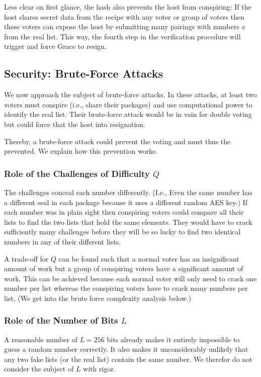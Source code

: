 \documentclass{article}
\theoremstyle{definition}
\begin{document}
	Less clear on first glance, the hash also prevents the host from conspiring: If the host shares secret data from the recipe with any voter or group of voters then these voters can expose the host by submitting many pairings with numbers $x$ from the real list. This way, the fourth step in the verification procedure will trigger and force Grace to resign.
	
	\subsection{Security: Brute-Force Attacks}
	We now approach the subject of brute-force attacks. In these attacks, at least two voters must conspire (i.e., share their packages) and use computational power to identify the real list. Their brute-force attack would be in vain for double voting but could force that the host into resignation.
	
	Thereby, a brute-force attack could prevent the voting and must thus the prevented. We explain how this prevention works.
	
	\subsubsection{Role of the Challenges of Difficulty $Q$}
	The challenges conceal each number differently. (I.e., Even the same number has a different seal in each package because it uses a different random AES key.) If each number was in plain sight then conspiring voters could compare all their lists to find the two lists that hold the same elements. They would have to crack sufficiently many challenges before they will be so lucky to find two identical numbers in any of their different lists.
	
	A trade-off for $Q$ can be found such that a normal voter has an insignificant amount of work but a group of conspiring voters have a significant amount of work. This can be achieved because each normal voter will only need to crack one number per list whereas the conspiring voters have to crack many numbers per list. (We get into the brute force complexity analysis below.)
	
	\subsubsection{Role of the Number of Bits $L$}
	A reasonable number of $L=256$ bits already makes it entirely impossible to guess a random number correctly. It also makes it unconsiderably unlikely that any two fake lists (or the real list) contain the same number. We therefor do not consider the subject of $L$ with rigor.
	
\end{document}
